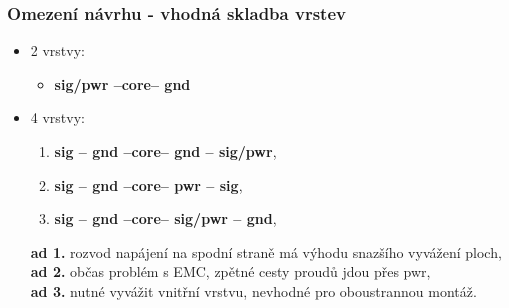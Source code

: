\documentclass{beamer}
\begin{document}
\begin{frame}
	\frametitle{Omezení návrhu - vhodná skladba vrstev}

	\begin{itemize}
		\item 2 vrstvy: 
		
		\begin{itemize}
			\item \textbf{sig/pwr --core-- gnd}
		\end{itemize}
		
		\item 4 vrstvy: 
		
		\begin{enumerate}
			\item \textbf{sig -- gnd --core-- gnd -- sig/pwr},
			\item \textbf{sig -- gnd --core-- pwr -- sig}, 
			\item \textbf{sig -- gnd --core-- sig/pwr -- gnd}, 
		\end{enumerate}
		
		\textbf{ad 1.} rozvod napájení na spodní straně má výhodu snazšího vyvážení ploch,\\
		\textbf{ad 2.} občas problém s EMC, zpětné cesty proudů jdou přes pwr,\\
		\textbf{ad 3.} nutné vyvážit vnitřní vrstvu, nevhodné pro oboustrannou montáž.
	\end{itemize}
\end{frame}
\end{document}
